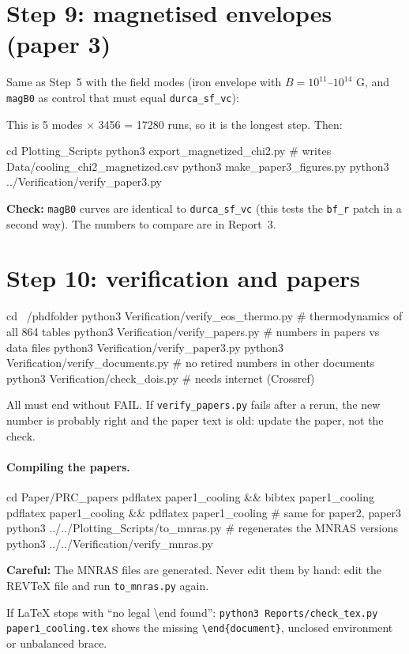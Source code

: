 \documentclass[11pt,a4paper]{article}
\newcommand{\f}[1]{\texttt{#1}}
\newcommand{\ok}[1]{\par\noindent\textcolor{okc}{\textbf{Check:}} #1\par}
\newcommand{\warn}[1]{\par\noindent\textcolor{warnc}{\textbf{Careful:}} #1\par}
\begin{document}
\section{Step 9: magnetised envelopes (paper 3)}
Same as Step~5 with the field modes (iron envelope with $B=10^{11}$--$10^{14}$ G, and \f{magB0} as control that must equal \f{durca\_sf\_vc}):
This is 5 modes $\times$ 3456 = 17280 runs, so it is the longest step. Then:
\begin{cmd}
cd Plotting_Scripts
python3 export_magnetized_chi2.py      # writes Data/cooling_chi2_magnetized.csv
python3 make_paper3_figures.py
python3 ../Verification/verify_paper3.py
\end{cmd}
\ok{\f{magB0} curves are identical to \f{durca\_sf\_vc} (this tests the \f{bf\_r} patch in a second way). The numbers to compare are in Report~3.}

\section{Step 10: verification and papers}
\begin{cmd}
cd ~/phdfolder
python3 Verification/verify_eos_thermo.py    # thermodynamics of all 864 tables
python3 Verification/verify_papers.py        # numbers in papers vs data files
python3 Verification/verify_paper3.py
python3 Verification/verify_documents.py     # no retired numbers in other documents
python3 Verification/check_dois.py           # needs internet (Crossref)
\end{cmd}
All must end without FAIL. If \f{verify\_papers.py} fails after a rerun, the new number is probably right and the paper text is old: update the paper, not the check.

\paragraph{Compiling the papers.}
\begin{cmd}
cd Paper/PRC_papers
pdflatex paper1_cooling && bibtex paper1_cooling
pdflatex paper1_cooling && pdflatex paper1_cooling   # same for paper2, paper3
python3 ../../Plotting_Scripts/to_mnras.py       # regenerates the MNRAS versions
python3 ../../Verification/verify_mnras.py
\end{cmd}
\warn{The MNRAS files are generated. Never edit them by hand: edit the REVTeX file and run \f{to\_mnras.py} again.}
If LaTeX stops with ``no legal \textbackslash end found'': \f{python3 Reports/check\_tex.py paper1\_cooling.tex} shows the missing \f{\textbackslash end\{document\}}, unclosed environment or unbalanced brace.
\end{document}
